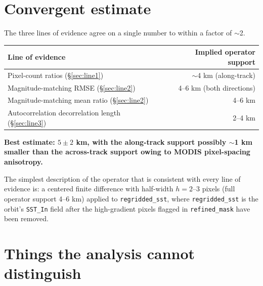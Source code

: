 \documentclass[11pt]{article}
\begin{document}
\section{Convergent estimate}\label{sec:answer}

The three lines of evidence agree on a single number to within a
factor of $\sim$2.

\begin{center}
\begin{tabular}{@{}lr@{}}
\toprule
Line of evidence & Implied operator support \\
\midrule
Pixel-count ratios (\S\ref{sec:line1})           & $\sim$4 km (along-track) \\
Magnitude-matching RMSE (\S\ref{sec:line2})      & 4--6 km (both directions) \\
Magnitude-matching mean ratio (\S\ref{sec:line2})& 4--6 km \\
Autocorrelation decorrelation length (\S\ref{sec:line3}) & 2--4 km \\
\bottomrule
\end{tabular}
\end{center}

\smallskip
\noindent\textbf{Best estimate: $5 \pm 2$ km, with the
along-track support possibly $\sim$1 km smaller than the
across-track support owing to MODIS pixel-spacing anisotropy.}

The simplest description of the operator that is consistent with
every line of evidence is: a centered finite difference with
half-width $h = 2$--$3$ pixels (full operator support 4--6 km)
applied to \texttt{regridded\_sst}, where
\texttt{regridded\_sst} is the orbit's
\texttt{SST\_In} field after the high-gradient pixels flagged in
\texttt{refined\_mask} have been removed.

\section{Things the analysis cannot distinguish}\label{sec:caveats}
\end{document}
